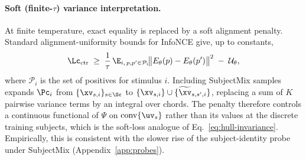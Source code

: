 \paragraph{Soft (finite-$\tau$) variance interpretation.}
At finite temperature, exact equality is replaced by a soft alignment
penalty. Standard alignment-uniformity bounds for InfoNCE give, up to
constants,
\begin{equation*}
    \Lc_{\mathrm{ctr}}
    \;\geq\;
    \frac{1}{\tau}\,
    \E_{i,\,p,p'\in\mathcal{P}_i}\!
    \bigl\|E_\theta(p)-E_\theta(p')\bigr\|^{2}
    \;-\;\mathcal{U}_\theta,
\end{equation*}
where $\mathcal{P}_i$ is the set of positives for stimulus $i$.
Including SubjectMix samples expands $\Pc_i$ from
$\{\xv_{s,i}\}_{s\in\Sc}$ to
$\{\xv_{s,i}\}\cup\{\widetilde{\xv}_{s,s',i}\}$, replacing
a sum of $K$ pairwise variance terms by an integral over chords. The
penalty therefore controls a continuous functional of $\Psi$ on
$\mathrm{conv}\{\uv_s\}$ rather than its values at the discrete
training subjects, which is the soft-loss analogue of
Eq.~\eqref{eq:hull-invariance}. Empirically, this is consistent with the
slower rise of the subject-identity probe under SubjectMix
(Appendix~\ref{app:probes}).
